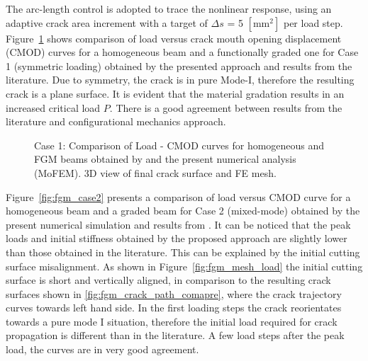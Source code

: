 \documentclass[onecolumn]{svjour3}
\begin{document}
The arc-length control is adopted to trace the nonlinear response, using an adaptive crack area increment with a target of $\Delta s$ = 5 $[\mathrm{mm}^2]$ per load step. Figure~\ref{fig:fgm_case1} shows comparison of load versus crack mouth opening displacement (CMOD) curves for a homogeneous beam and a functionally graded one for Case 1 (symmetric loading) obtained by the presented approach and results from the literature. Due to symmetry, the crack is in pure Mode-I, therefore the resulting crack is a plane surface. It is evident that the material gradation results in an increased critical load $P$. There is a good agreement between results from the literature and configurational mechanics approach. 
% 
% 
\begin{figure}
	\centering
	\caption{Case 1: Comparison of Load - CMOD curves for homogeneous and FGM beams obtained by \citep{kim2004simulation} and the present numerical analysis (MoFEM). 3D view of final crack surface and FE mesh.}
	\label{fig:fgm_case1}
\end{figure}
% 
% 
Figure~\ref{fig:fgm_case2} presents a comparison of load versus CMOD curve for a homogeneous beam and a graded beam for Case 2 (mixed-mode) obtained by the present numerical simulation and results from \citep{kim2004simulation}. It can be noticed that the peak loads and initial stiffness obtained by the proposed approach are slightly lower than those obtained in the literature. This can be explained by the initial cutting surface misalignment. As shown in Figure~\ref{fig:fgm_mesh_load} the initial cutting surface is short and vertically aligned, in comparison to the resulting crack surfaces shown in \ref{fig:fgm_crack_path_comapre}, where the crack trajectory curves towards left hand side. In the first loading steps the crack reorientates towards a pure mode I situation, therefore the initial load required for crack propagation is different than in the literature. A few load steps after the peak load, the curves are in very good agreement. 
\end{document}
